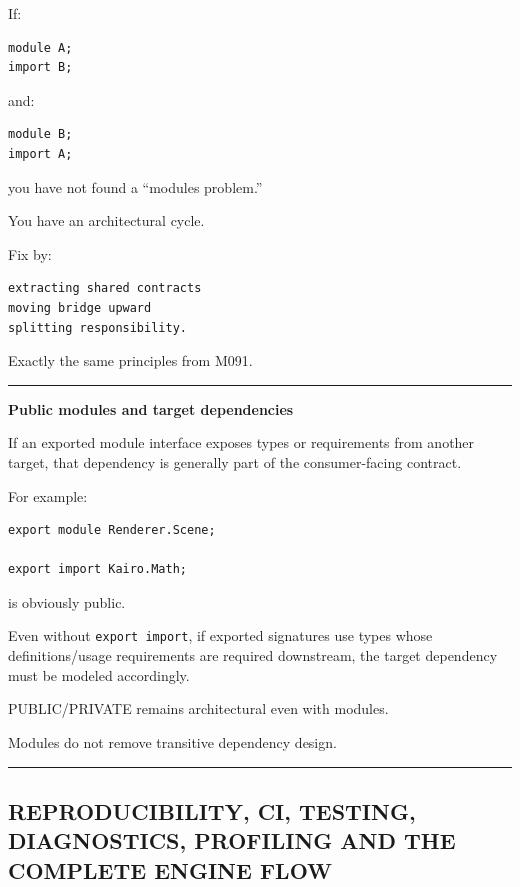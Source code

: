 If:

\begin{verbatim}
module A;
import B;
\end{verbatim}

and:

\begin{verbatim}
module B;
import A;
\end{verbatim}

you have not found a ``modules problem.''

You have an architectural cycle.

Fix by:

\begin{verbatim}
extracting shared contracts
moving bridge upward
splitting responsibility.
\end{verbatim}

Exactly the same principles from M091.

\begin{center}\rule{0.5\linewidth}{0.5pt}\end{center}

\textbf{Public modules and target dependencies}

If an exported module interface exposes types or requirements from another target, that dependency is generally part of the consumer-facing contract.

For example:

\begin{verbatim}
export module Renderer.Scene;

export import Kairo.Math;
\end{verbatim}

is obviously public.

Even without \texttt{export\ import}, if exported signatures use types whose definitions/usage requirements are required downstream, the target dependency must be modeled accordingly.

PUBLIC/PRIVATE remains architectural even with modules.

Modules do not remove transitive dependency design.

\begin{center}\rule{0.5\linewidth}{0.5pt}\end{center}

\subsection{REPRODUCIBILITY, CI, TESTING, DIAGNOSTICS, PROFILING AND THE COMPLETE ENGINE FLOW}\label{03-visual-computing-i-ch017-reproducibility-ci-testing-diagnostics-profiling-and-the-complete-engine-flow}

